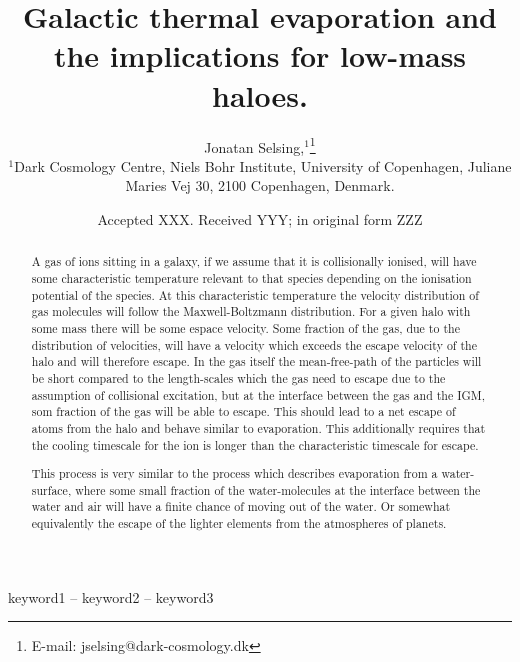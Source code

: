 \documentclass[a4paper,fleqn,usenatbib]{mnras}
\title[Galactic Thermal Evaporation]{Galactic thermal evaporation and the implications for low-mass haloes.}
\author[Selsing]{
Jonatan Selsing,$^{1}$\thanks{E-mail: jselsing@dark-cosmology.dk}
\\
$^{1}$Dark Cosmology Centre, Niels Bohr Institute, University of Copenhagen, Juliane
Maries Vej 30, 2100 Copenhagen, Denmark.}
\date{Accepted XXX. Received YYY; in original form ZZZ}
\begin{document}
\label{firstpage}
\pagerange{\pageref{firstpage}--\pageref{lastpage}}
\maketitle

\begin{abstract}
A gas of ions sitting in a galaxy, if we assume that it is collisionally ionised, will have some characteristic temperature relevant to that species depending on the ionisation potential of the species. At this characteristic temperature the velocity distribution of gas molecules will follow the Maxwell-Boltzmann distribution. For a given halo with some mass there will be some espace velocity. Some fraction of the gas, due to the distribution of velocities, will have a velocity which exceeds the escape velocity of the halo and will therefore escape. In the gas itself the mean-free-path of the particles will be short compared to the length-scales which the gas need to escape due to the assumption of collisional excitation, but at the interface between the gas and the IGM, som fraction of the gas will be able to escape. This should lead to a net escape of atoms from the halo and behave similar to evaporation. This additionally requires that the cooling timescale for the ion is longer than the characteristic timescale for escape. 

This process is very similar to the process which describes evaporation from a water-surface, where some small fraction of the water-molecules at the interface between the water and air will have a finite chance of moving out of the water. Or somewhat equivalently the escape of the lighter elements from the atmospheres of planets. 
\end{abstract}

\begin{keywords}
keyword1 -- keyword2 -- keyword3
\end{keywords}


\end{document}
